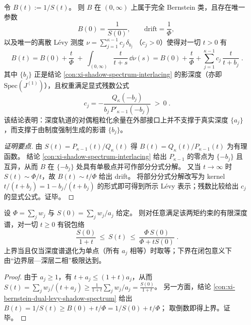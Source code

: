 \begin{proposition}\label{con:xi-bernstein-dual-levy-shadow-spectrum}
令 \(B(t):=1/S(t)\)。
则 \(B\) 在 \((0,\infty)\) 上属于完全 Bernstein 类，且存在唯一参数
\[
B(0)=\frac{1}{S(0)},
\qquad
\mathrm{drift}=\frac{1}{\Phi},
\]
以及唯一的离散 Lévy 测度
\(
\nu=\sum_{j=1}^{\kappa-1} c_j\,\delta_{b_j}
\)
（\(c_j>0\)）使得对一切 \(t>0\) 有
\[
\boxed{\;
B(t)=B(0)+\frac{t}{\Phi}
\;+\;\int_{(0,\infty)}\frac{t}{t+s}\,\dd\nu(s)
=B(0)+\frac{t}{\Phi}+\sum_{j=1}^{\kappa-1}c_j\,\frac{t}{t+b_j}\; }.
\]
其中 \(\{b_j\}\) 正是结论 \ref{con:xi-shadow-spectrum-interlacing} 的影深度（亦即 \(\mathrm{Spec}(J^{(1)})\)），且权重满足显式残数公式
\[
\boxed{\;
c_j=-\frac{Q_{\kappa}(-b_j)}{b_j\,P'_{\kappa-1}(-b_j)}\ >\ 0\; }.
\]
该结论表明：深度轨道的对偶粗粒化余量在外部接口上并不支撑于真实深度 \(\{a_j\}\)，而支撑于由制度强制生成的影谱 \(\{b_j\}\)。
\end{proposition}
\begin{proof}[证明要点]
由 \(S(t)=P_{\kappa-1}(t)/Q_{\kappa}(t)\) 得 \(B(t)=Q_{\kappa}(t)/P_{\kappa-1}(t)\) 为有理函数。
结论 \ref{con:xi-shadow-spectrum-interlacing} 给出 \(P_{\kappa-1}\) 的零点为 \(\{-b_j\}\) 且互异，从而 \(B\) 在 \(\{-b_j\}\) 处具有单极点并可作部分分式分解。
又当 \(t\to\infty\) 时 \(S(t)\sim \Phi/t\)，故 \(B(t)\sim t/\Phi\) 给出 drift。
将部分分式分解改写为 kernel \(t/(t+b_j)=1-b_j/(t+b_j)\) 的形式即可得到所示 Lévy 表示；残数比较给出 \(c_j\) 的显式公式。证毕。
\end{proof}

\begin{proposition}\label{con:xi-two-moment-envelope}
设 \(\Phi=\sum_j w_j\) 与 \(S(0)=\sum_j w_j/a_j\) 给定。
则对任意满足该两矩约束的有限深度谱，对一切 \(t\ge 0\) 有锐包络
\[
\boxed{\;
\frac{S(0)}{1+t}\ \le\ S(t)\ \le\ \frac{\Phi\,S(0)}{\Phi+tS(0)}\; }.
\]
上界当且仅当深度谱退化为单点（所有 \(a_j\) 相等）时取等；下界在闭包意义下由“边界层—深层二相”极限达到。
\end{proposition}
\begin{proof}
由于 \(a_j\ge 1\)，有 \(t+a_j\le (1+t)a_j\)，从而
\(
S(t)=\sum_j w_j/(t+a_j)\ge \frac{1}{1+t}\sum_j w_j/a_j=\frac{S(0)}{1+t}
\)。
另一方面，结论 \ref{con:xi-bernstein-dual-levy-shadow-spectrum} 给出
\(
B(t)=1/S(t)\ge B(0)+t/\Phi=1/S(0)+t/\Phi
\)；
取倒数即得上界。证毕。
\end{proof}

